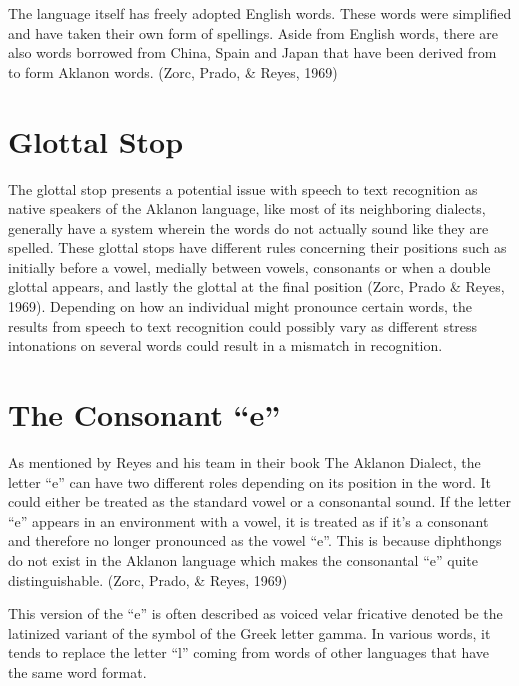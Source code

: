 The language itself has freely adopted English words. These words were simplified and have taken their own form of spellings. Aside from English words, there are also words borrowed from China, Spain and Japan that have been derived from to form Aklanon words. (Zorc, Prado, \& Reyes, 1969)

\section{Glottal Stop}

The glottal stop presents a potential issue with speech to text recognition as native speakers of the Aklanon language, like most of its neighboring dialects, generally have a system wherein the words do not actually sound like they are spelled. These glottal stops have different rules concerning their positions such as initially before a vowel, medially between vowels, consonants or when a double glottal appears, and lastly the glottal at the final position (Zorc, Prado \& Reyes, 1969). Depending on how an individual might pronounce certain words, the results from speech to text recognition could possibly vary as different stress intonations on several words could result in a mismatch in recognition.

\section{The Consonant “e”}
As mentioned by Reyes and his team in their book The Aklanon Dialect, the letter “e” can have two different roles depending on its position in the word. It could either be treated as the standard vowel or a consonantal sound. If the letter “e” appears in an environment with a vowel, it is treated as if it’s a consonant and therefore no longer pronounced as the vowel “e”. This is because diphthongs do not exist in the Aklanon language which makes the consonantal “e” quite distinguishable. (Zorc, Prado, \& Reyes, 1969)

This version of the “e” is often described as voiced velar fricative denoted be the latinized variant of the symbol of the Greek letter gamma. In various words, it tends to replace the letter “l” coming from words of other languages that have the same word format.
